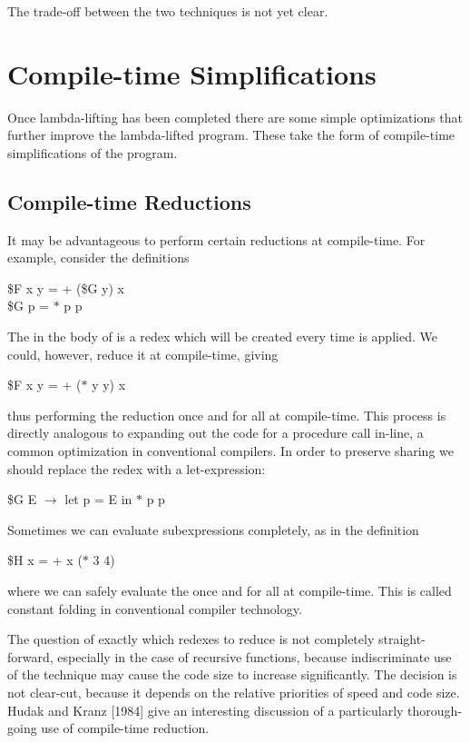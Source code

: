 The trade-off between the two techniques is not yet clear.

\section{Compile-time Simplifications}

Once lambda-lifting has been completed there are some simple optimizations
that further improve the lambda-lifted program. These take the form of
compile-time simplifications of the program.

\subsection{Compile-time Reductions}

It may be advantageous to perform certain reductions at compile-time. For
example, consider the definitions
\begin{mlcoded}
    \$F x y = + (\$G y) x \\
    \$G p = $\ast$ p p
\end{mlcoded}
The  in the body of  is a redex which will be created every time  is
applied. We could, however, reduce it at compile-time, giving
\begin{mlcoded}
    \$F x y = + ($\ast$ y y) x
\end{mlcoded}
thus performing the  reduction once and for all at compile-time. This
process is directly analogous to expanding out the code for a procedure call
in-line, a common optimization in conventional compilers. In order to
preserve sharing we should replace the redex with a let-expression:
\begin{mlcoded}
    \$G E $\rightarrow$ let p = E in $\ast$ p p
\end{mlcoded}
Sometimes we can evaluate subexpressions completely, as in the definition
\begin{mlcoded}
    \$H x = + x ($\ast$ 3 4)
\end{mlcoded}
where we can safely evaluate the  once and for all at compile-time.
This is called constant folding in conventional compiler technology.

The question of exactly which redexes to reduce is not completely straight-forward, especially in the case of recursive functions, because indiscriminate use of the technique may cause the code size to increase significantly. The decision is not clear-cut, because it depends on the relative priorities of speed and code size. Hudak and Kranz [1984] give an interesting discussion of a particularly thorough-going use of compile-time reduction.

